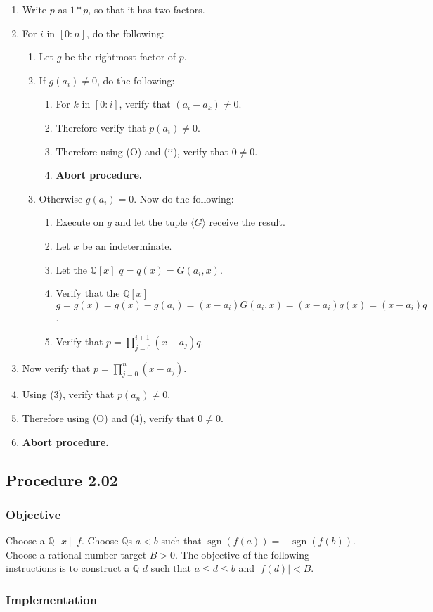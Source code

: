 \documentclass[twocolumn]{article}
\DeclareMathOperator{\sgn}{sgn}
\newcommand{\procedure}[2][]{\subsection*{Procedure #2 \ifthenelse{\equal{#1}{}}{}{(#1)}}\label{sec:procedure #2}}
\newcommand{\objective}{\subsubsection*{Objective}}
\newcommand{\implementation}{\subsubsection*{Implementation}}
\newcommand{\procedurehr}[2][]{\hyperref[sec:procedure #2]{\ifthenelse{\equal{#1}{}}{procedure #2}{#1}}}
\begin{document}
				\begin{enumerate}
					\item Write $p$ as $1*p$, so that it has two factors.
					\item For $i$ in $[0:n]$, do the following:
					\begin{enumerate}
						\item Let $g$ be the rightmost factor of $p$.
						\item If $g(a_i)\ne 0$, do the following:
						\begin{enumerate}
							\item For $k$ in $[0:i]$, verify that $(a_i-a_k)\ne 0$.
							\item Therefore verify that $p(a_i)\ne 0$.
							\item Therefore using (O) and (ii), verify that $0\ne 0$.
							\item \textbf{Abort procedure.}
						\end{enumerate}
						\item Otherwise $g(a_i)=0$. Now do the following:
						\begin{enumerate}
							\item Execute \procedurehr{2.00} on $g$ and let the tuple $\langle G\rangle$ receive the result.
							\item Let $x$ be an indeterminate.
							\item Let the $\mathbb{Q}[x]$ $q=q(x)=G(a_i,x)$.
							\item Verify that the $\mathbb{Q}[x]$ $g=g(x)=g(x)-g(a_i)=(x-a_i)G(a_i,x)=(x-a_i)q(x)=(x-a_i)q$.
							\item Verify that $p=\prod_{j=0}^{i+1}(x-a_j)q$.
						\end{enumerate}
					\end{enumerate}
					\item Now verify that $p=\prod_{j=0}^{n}(x-a_j)$.
					\item Using (3), verify that $p(a_{n})\ne 0$.
					\item Therefore using (O) and (4), verify that $0\ne 0$.
					\item \textbf{Abort procedure.}
				\end{enumerate}
		\procedure{2.02}
			\objective
				Choose a $\mathbb{Q}[x]$ $f$. Choose $\mathbb{Q}$s $a<b$ such that $\sgn(f(a))=-\sgn(f(b))$. Choose a rational number target $B>0$. The objective of the following instructions is to construct a $\mathbb{Q}$ $d$ such that $a\le d\le b$ and $\lvert f(d)\rvert<B$.
			\implementation
\end{document}
